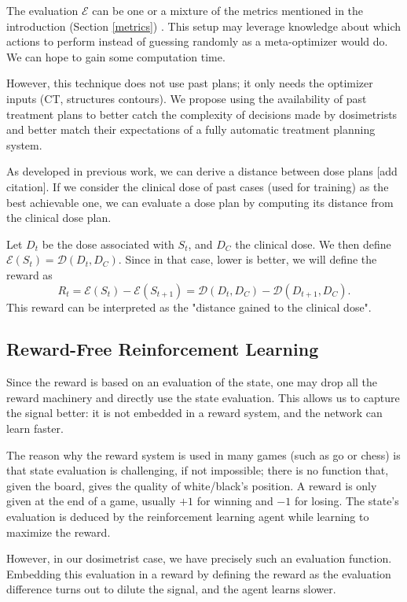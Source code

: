The evaluation $\mathcal{E}$ can be one or a mixture of the metrics mentioned in the introduction (Section \ref{metrics}) \cite{shen_hierarchical_2021} \cite{shen_intelligent_2019} \cite{moreau_reinforcement_2021}.
This setup may leverage knowledge about which actions to perform instead of guessing randomly as a meta-optimizer would do.
We can hope to gain some computation time.

However, this technique does not use past plans; it only needs the optimizer inputs (CT, structures contours).
We propose using the availability of past treatment plans to better catch the complexity of decisions made by dosimetrists and better match their expectations of a fully automatic treatment planning system.

As developed in previous work, we can derive a distance between dose plans [add citation].
If we consider the clinical dose of past cases (used for training) as the best achievable one, we can evaluate a dose plan by computing its distance from the clinical dose plan.

Let $D_t$ be the dose associated with $S_t$, and $D_C$ the clinical dose.
We then define $\mathcal{E}(S_t) = \mathcal{D}(D_t, D_C)$.
Since in that case, lower is better, we will define the reward as $$R_t = \mathcal{E}(S_t) - \mathcal{E}(S_{t+1}) = \mathcal{D}(D_t, D_C) - \mathcal{D}(D_{t+1}, D_C).$$
This reward can be interpreted as the "distance gained to the clinical dose".


\subsection{Reward-Free Reinforcement Learning}

Since the reward is based on an evaluation of the state, one may drop all the reward machinery and directly use the state evaluation.
This allows us to capture the signal better: it is not embedded in a reward system, and the network can learn faster.

The reason why the reward system is used in many games (such as go or chess) is that state evaluation is challenging, if not impossible; there is no function that, given the board, gives the quality of white/black's position.
A reward is only given at the end of a game, usually $+1$ for winning and $-1$ for losing.
The state's evaluation is deduced by the reinforcement learning agent while learning to maximize the reward.

However, in our dosimetrist case, we have precisely such an evaluation function.
Embedding this evaluation in a reward by defining the reward as the evaluation difference turns out to dilute the signal, and the agent learns slower.

